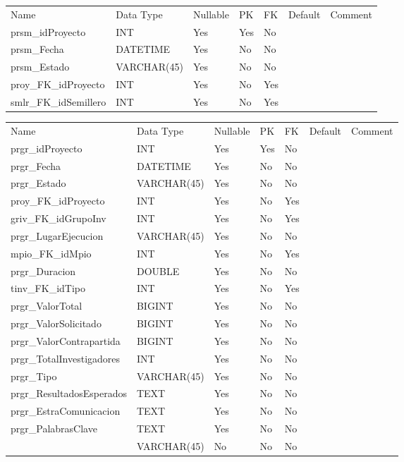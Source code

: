 			\begin{center}
				\begin{tabular}{ |l|l|l|l|l|l|l| }
					\hline
					Name & Data Type & Nullable & PK & FK & Default & Comment \\
					prsm_idProyecto & INT & Yes & Yes & No &  & \\ \hline 
prsm_Fecha & DATETIME & Yes & No & No &  & \\ \hline 
prsm_Estado & VARCHAR(45) & Yes & No & No &  & \\ \hline 
proy_FK_idProyecto & INT & Yes & No & Yes &  & \\ \hline 
smlr_FK_idSemillero & INT & Yes & No & Yes &  & \\ \hline 

				\end{tabular}
			\end{center}
		

			\begin{center}
				\begin{tabular}{ |l|l|l|l|l|l|l| }
					\hline
					Name & Data Type & Nullable & PK & FK & Default & Comment \\
					prgr_idProyecto & INT & Yes & Yes & No &  & \\ \hline 
prgr_Fecha & DATETIME & Yes & No & No &  & \\ \hline 
prgr_Estado & VARCHAR(45) & Yes & No & No &  & \\ \hline 
proy_FK_idProyecto & INT & Yes & No & Yes &  & \\ \hline 
griv_FK_idGrupoInv & INT & Yes & No & Yes &  & \\ \hline 
prgr_LugarEjecucion & VARCHAR(45) & Yes & No & No &  & \\ \hline 
mpio_FK_idMpio & INT & Yes & No & Yes &  & \\ \hline 
prgr_Duracion & DOUBLE & Yes & No & No &  & \\ \hline 
tinv_FK_idTipo & INT & Yes & No & Yes &  & \\ \hline 
prgr_ValorTotal & BIGINT & Yes & No & No &  & \\ \hline 
prgr_ValorSolicitado & BIGINT & Yes & No & No &  & \\ \hline 
prgr_ValorContrapartida & BIGINT & Yes & No & No &  & \\ \hline 
prgr_TotalInvestigadores & INT & Yes & No & No &  & \\ \hline 
prgr_Tipo & VARCHAR(45) & Yes & No & No &  & \\ \hline 
prgr_ResultadosEsperados & TEXT & Yes & No & No &  & \\ \hline 
prgr_EstraComunicacion & TEXT & Yes & No & No &  & \\ \hline 
prgr_PalabrasClave & TEXT & Yes & No & No &  & \\ \hline 
 & VARCHAR(45) & No & No & No &  & \\ \hline 

				\end{tabular}
			\end{center}
		

